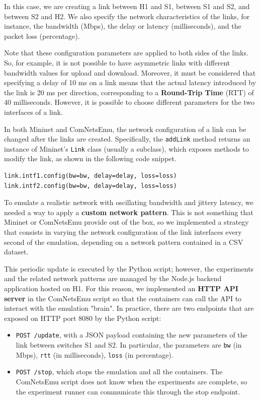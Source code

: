 In this case, we are creating a link between H1 and S1, between S1 and S2, and between S2 and H2. We also specify the network characteristics of the links, for instance, the bandwidth (Mbps), the delay or latency (milliseconds), and the packet loss (percentage).

Note that these configuration parameters are applied to both sides of the links. So, for example, it is not possible to have asymmetric links with different bandwidth values for upload and download. Moreover, it must be considered that specifying a delay of 10 ms on a link means that the actual latency introduced by the link is 20 ms per direction, corresponding to a \textbf{Round-Trip Time} (RTT) of 40 milliseconds. However, it is possible to choose different parameters for the two interfaces of a link.

In both Mininet and ComNetsEmu, the network configuration of a link can be changed after the links are created. Specifically, the \texttt{addLink} method returns an instance of Mininet's \texttt{Link} class (usually a subclass), which exposes methods to modify the link, as shown in the following code snippet.

\begin{verbatim}
link.intf1.config(bw=bw, delay=delay, loss=loss)
link.intf2.config(bw=bw, delay=delay, loss=loss)
\end{verbatim}

To emulate a realistic network with oscillating bandwidth and jittery latency, we needed a way to apply a \textbf{custom network pattern}. This is not something that Mininet or ComNetsEmu provide out of the box, so we implemented a strategy that consists in varying the network configuration of the link interfaces every second of the emulation, depending on a network pattern contained in a CSV dataset.

This periodic update is executed by the Python script; however, the experiments and the related network patterns are managed by the Node.js backend application hosted on H1. For this reason, we implemented an \textbf{HTTP API server} in the ComNetsEmu script so that the containers can call the API to interact with the emulation "brain". In practice, there are two endpoints that are exposed on HTTP port 8080 by the Python script:


\begin{itemize}
    \item \texttt{POST /update}, with a JSON payload containing the new parameters of the link between switches S1 and S2. In particular, the parameters are \texttt{bw} (in Mbps), \texttt{rtt} (in milliseconds), \texttt{loss} (in percentage).
    \item \texttt{POST /stop}, which stops the emulation and all the containers. The ComNetsEmu script does not know when the experiments are complete, so the experiment runner can communicate this through the stop endpoint.
\end{itemize}

